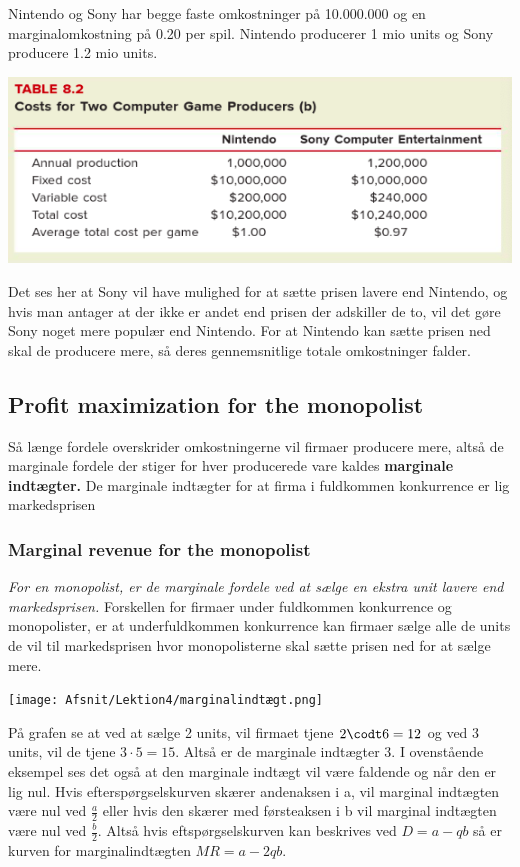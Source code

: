 \begin{eks} \textbf{} %
\newline
Nintendo og Sony har begge faste omkostninger på 10.000.000 og en marginalomkostning på 0.20 per spil. Nintendo producerer 1 mio units og Sony producere 1.2 mio units.  

\includegraphics[scale=0.8]{Afsnit/Lektion4/Nintendoogsony.png}

Det ses her at Sony vil have mulighed for at sætte prisen lavere end Nintendo, og hvis man antager at der ikke er andet end prisen der adskiller de to, vil det gøre Sony noget mere populær end Nintendo. For at Nintendo kan sætte prisen ned skal de producere mere, så deres gennemsnitlige totale omkostninger falder. 
\end{eks}

\subsection{Profit maximization for the monopolist}
Så længe fordele overskrider omkostningerne vil firmaer producere mere, altså de marginale fordele der stiger for hver producerede vare kaldes \textbf{marginale indtægter.} De marginale indtægter for at firma i fuldkommen konkurrence er lig markedsprisen 

\subsubsection{Marginal revenue for the monopolist}
\textit{For en monopolist, er de marginale fordele ved at sælge en ekstra unit lavere end markedsprisen. } Forskellen for firmaer under fuldkommen konkurrence og monopolister, er at underfuldkommen konkurrence kan firmaer sælge alle de units de vil til markedsprisen hvor monopolisterne skal sætte prisen ned for at sælge mere.

\texttt{[image: Afsnit/Lektion4/marginalindtægt.png]}

På grafen se at ved at sælge 2 units, vil firmaet tjene $2 \codt 6 = 12$ og ved 3 units, vil de tjene $3 \cdot 5 = 15$. Altså er de marginale indtægter $3$. I ovenstående eksempel ses det også at den marginale indtægt vil være faldende og når den er lig nul. Hvis efterspørgselskurven skærer andenaksen i a, vil marginal indtægten være nul ved $\frac{a}{2}$ eller hvis den skærer med førsteaksen i b vil marginal indtægten være nul ved $\frac{b}{2}$. Altså hvis eftspørgselskurven kan beskrives ved $D = a - qb$ så er kurven for marginalindtægten $MR = a - 2qb$. 


